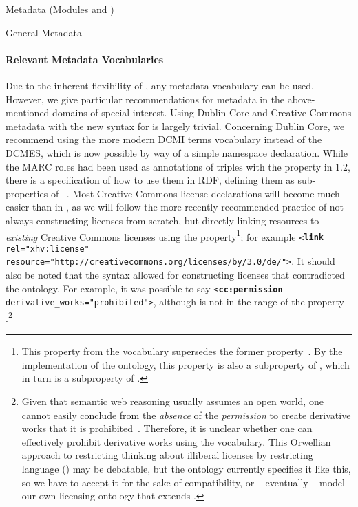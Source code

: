 \begin{tchapter}[id=metadata,short=Metadata]{Metadata (Modules {} and  {})}
\begin{tsection}{General Metadata}
\paragraph{Relevant Metadata Vocabularies}
\label{sec:new-metadata-vocab}

Due to the inherent flexibility of \rdfa, any metadata vocabulary can
be used.  However, we give particular recommendations for metadata in
the above-mentioned domains of special interest.  Using Dublin Core
and Creative Commons metadata with the new \rdfa syntax for \omdoc is
largely trivial.  Concerning Dublin Core, we recommend using the more
modern DCMI terms vocabulary instead of the DCMES, which is now
possible by way of a simple namespace declaration.  While the MARC
roles had been used as annotations of triples with the
 property in {\omdoc} 1.2, there is a
specification of how to use them in RDF, defining them as
sub-properties of
~\cite{Johnston:MARC-DC05}.  Most Creative
Commons license declarations will become much easier than in , as we will follow the more recently recommended practice of not
always constructing licenses from scratch, but directly linking
resources to \emph{existing} Creative Commons licenses using the
 property\footnote{This property from the
  \xhtml vocabulary   supersedes the former 
  property~\cite{AALY08:ccREL}.  By the   implementation of the \ccrel
  ontology, this property is also a subproperty of
  , which in turn is a subproperty of
  .}; for example
\texttt{<\textbf{link}   rel="xhv:license"
  resource="http://creativecommons.org/licenses/by/3.0/de/">}.  It
should also be noted that the  syntax allowed for
constructing licenses that contradicted the \ccrel ontology.  For
example, it was possible to say \texttt{<\textbf{cc:permission}
  derivative\_works="prohibited">}, although
 is not in the range of the property
.\footnote{Given that semantic web reasoning
  usually assumes an   open world, one cannot easily conclude from the
  \emph{absence} of the   \emph{permission} to create derivative works
  that it is   prohibited~\cite{W3C:ccREL-comment}.  Therefore, it is
  unclear whether one can   effectively prohibit derivative works
  using the \ccrel vocabulary.  This Orwellian   approach to
  restricting thinking about illiberal licenses by restricting
  language (\cf   \cite{Orwell:1984}) may be debatable, but the \ccrel
  ontology currently specifies it   like this, so we have to accept it
  for the sake of compatibility, or -- eventually --   model our own
  licensing ontology that extends \ccrel.}


\end{tsection}
\end{tchapter}
